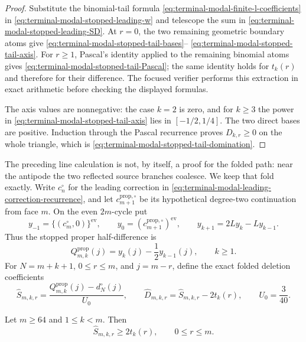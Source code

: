 \begin{proof}
Substitute the binomial-tail formula
\eqref{eq:terminal-modal-finite-l-coefficients} in
\eqref{eq:terminal-modal-stopped-leading-w} and telescope the sum in
\eqref{eq:terminal-modal-stopped-leading-SD}.  At $r=0$, the two remaining
geometric boundary atoms give
\eqref{eq:terminal-modal-stopped-tail-bases}--
\eqref{eq:terminal-modal-stopped-tail-axis}.  For $r\ge1$, Pascal's identity
applied to the remaining binomial atoms gives
\eqref{eq:terminal-modal-stopped-tail-Pascal}; the same identity holds for
$t_k(r)$ and therefore for their difference.  The focused verifier performs
this extraction in exact arithmetic before checking the displayed formulas.

The axis values are nonnegative: the case $k=2$ is zero, and for $k\ge3$
the power in \eqref{eq:terminal-modal-stopped-tail-axis} lies in
$[-1/2,1/4]$.  The two direct bases are positive.  Induction through the
Pascal recurrence proves $D_{k,r}\ge0$ on the whole triangle, which is
\eqref{eq:terminal-modal-stopped-tail-domination}.
\end{proof}

The preceding line calculation is not, by itself, a proof for the folded
path: near the antipode the two reflected source branches coalesce.  We keep
that fold exactly.  Write $c_n^\circ$ for the leading correction in
\eqref{eq:terminal-modal-leading-correction-recurrence}, and let
$c_{m+1}^{\mathrm{prop},\circ}$ be its hypothetical degree-two continuation
from face $m$.  On the even $2m$-cycle put
\begin{equation}
 y_{-1}=\{(c_m^\circ,0)\}^{\mathrm{ev}},\qquad
 y_0=(c_{m+1}^{\mathrm{prop},\circ})^{\mathrm{ev}},\qquad
 y_{k+1}=2Ly_k-Ly_{k-1}.
 \label{eq:terminal-modal-stopped-proper-trajectory}
\end{equation}
Thus the stopped proper half-difference is
\begin{equation}
 Q_{m,k}^{\mathrm{prop}}(j)=y_k(j)-\frac12y_{k-1}(j),
 \qquad k\ge1.
 \label{eq:terminal-modal-stopped-proper-half-difference}
\end{equation}
For $N=m+k+1$, $0\le r\le m$, and $j=m-r$, define the exact folded
deletion coefficients
\begin{equation}
 \widehat S_{m,k,r}
 =\frac{Q_{m,k}^{\mathrm{prop}}(j)-d_N^\circ(j)}{U_0},\qquad
 \widehat D_{m,k,r}=\widehat S_{m,k,r}-2t_k(r),\qquad
 U_0=\frac3{40}.
 \label{eq:terminal-modal-stopped-folded-SD}
\end{equation}

\begin{lemma}
\label{lem:terminal-modal-stopped-folded-tail}
Let $m\ge64$ and $1\le k<m$.  Then
\begin{equation}
 \widehat S_{m,k,r}\ge2t_k(r),\qquad0\le r\le m.
 \label{eq:terminal-modal-stopped-folded-tail}
\end{equation}
\end{lemma}

